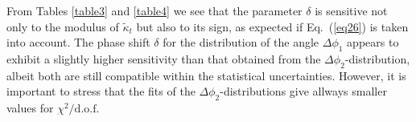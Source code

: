 \documentclass[aps,preprint,tightenlines,floatfix,superscriptaddress,nofootinbib,showpacs]{revtex4-1}
\def\kpt{\tilde{\kappa}_t}
\begin{document}
\par From Tables \ref{table3} and \ref{table4} we see that the
parameter $\delta$ is sensitive not only to the modulus of $\kpt$ but
also to its sign, as expected if Eq.~(\ref{eq26}) is taken into
account. The phase shift $\delta$ for the distribution of the angle
$\Delta\phi_1$ appears to exhibit a slightly higher sensitivity than
that obtained from the $\Delta\phi_2$-distribution, albeit both are
still compatible within the statistical uncertainties. However, it is
important to stress that the fits of the $\Delta\phi_2$-distributions
give allways smaller values for $\chi^2/\mathrm{d.o.f}$.
\begin{center}
\begin{figure}[H]
\hspace*{-0.52cm}
\hspace*{-0.006\textwidth}
 \\

\end{figure}
\end{center}
\end{document}
